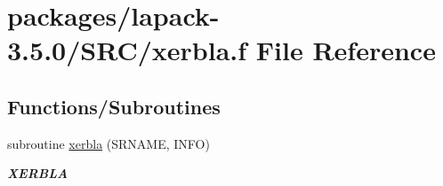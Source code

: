 \hypertarget{lapack-3_85_80_2SRC_2xerbla_8f}{}\section{packages/lapack-\/3.5.0/\+S\+R\+C/xerbla.f File Reference}
\label{lapack-3_85_80_2SRC_2xerbla_8f}
\subsection*{Functions/\+Subroutines}
\begin{DoxyCompactItemize}
\item 
subroutine \hyperlink{group__auxOTHERauxiliary_ga377ee61015baf8dea7770b3a404b1c07}{xerbla} (S\+R\+N\+A\+M\+E, I\+N\+F\+O)
\begin{DoxyCompactList}\small\item\em {\bfseries X\+E\+R\+B\+L\+A} \end{DoxyCompactList}\end{DoxyCompactItemize}
